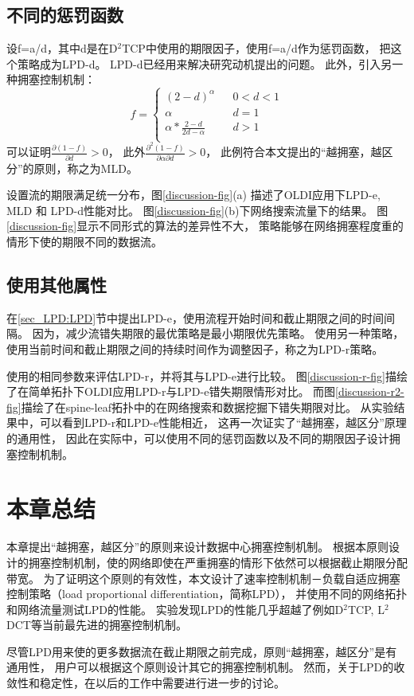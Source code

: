 \subsection{不同的惩罚函数}
设f=a/d，其中d是在D$^2$TCP中使用的期限因子，使用f=a/d作为惩罚函数，
把这个策略成为LPD-d。
LPD-d已经用来解决研究动机提出的问题。
此外，引入另一种拥塞控制机制：
$$ f=\left\{
\begin{array}{rcl}
(2-d)^\alpha      &      & {0      <d      <1}\\
\alpha    &      & {d=1}\\
\alpha*\frac{2-d}{2d-\alpha}     &      & {d>1}\\
\end{array} \right. $$
可以证明$\frac{\partial{(1-f)}}{\partial{d}}>0$， 此外$\frac{\partial^{2}{(1-f)}}{\partial{\alpha}\partial{d}}>0$，
此例符合本文提出的“越拥塞，越区分”的原则，称之为MLD。


设置流的期限满足统一分布，图\ref{discussion-fig}(a) 描述了OLDI应用下LPD-e, MLD 和 LPD-d性能对比。
图\ref{discussion-fig}(b)下网络搜索流量下的结果。
图\ref{discussion-fig}显示不同形式的算法的差异性不大，
策略能够在网络拥塞程度重的情形下使的期限不同的数据流。

\subsection{使用其他属性}

在\ref{sec_LPD:LPD}节中提出LPD-e，使用流程开始时间和截止期限之间的时间间隔。
因为，减少流错失期限的最优策略是最小期限优先策略。 
使用另一种策略，使用当前时间和截止期限之间的持续时间作为调整因子，称之为LPD-r策略。
 
 
使用的相同参数来评估LPD-r，并将其与LPD-e进行比较。
 图\ref{discussion-r-fig}描绘了在简单拓扑下OLDI应用LPD-r与LPD-e错失期限情形对比。
 而图\ref{discussion-r2-fig}描绘了在spine-leaf拓扑中的在网络搜索和数据挖掘下错失期限对比。
从实验结果中，可以看到LPD-r和LPD-e性能相近，
这再一次证实了“越拥塞，越区分”原理的通用性，
因此在实际中，可以使用不同的惩罚函数以及不同的期限因子设计拥塞控制机制。

\section{本章总结}
\label{sec_LPD:Conclusion}
本章提出“越拥塞，越区分”的原则来设计数据中心拥塞控制机制。
根据本原则设计的拥塞控制机制，使的网络即使在严重拥塞的情形下依然可以根据截止期限分配带宽。
为了证明这个原则的有效性，本文设计了速率控制机制－负载自适应拥塞控制策略（load proportional differentiation，简称LPD），
并使用不同的网络拓扑和网络流量测试LPD的性能。
实验发现LPD的性能几乎超越了例如D$^{2}$TCP, L$^{2}$DCT等当前最先进的拥塞控制机制。

尽管LPD用来使的更多数据流在截止期限之前完成，原则“越拥塞，越区分”是有通用性，
用户可以根据这个原则设计其它的拥塞控制机制。
然而，关于LPD的收敛性和稳定性，在以后的工作中需要进行进一步的讨论。


